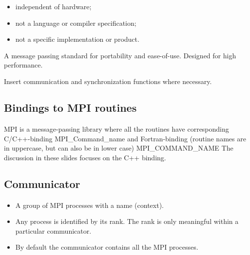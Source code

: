 \documentclass[%
oneside,                 %
final,                   %
10pt]{article}
\begin{document}
\begin{itemize}
\item independent of hardware;

\item not a language or compiler specification;

\item not a specific implementation or product.
\end{itemize}

\noindent
A message passing standard for portability and ease-of-use. 
Designed for high performance.

Insert communication and synchronization functions where necessary.





\subsection{Bindings to MPI routines}

\paragraph{}


MPI is a message-passing library where all the routines
have corresponding C/C++-binding
\bcppcod
   MPI_Command_name
\ecppcod
and Fortran-binding (routine names are in uppercase, but can also be in lower case)
\bforcod
   MPI_COMMAND_NAME
\eforcod
The discussion in these slides focuses on the C++ binding.




\subsection{Communicator}

\paragraph{}
\begin{itemize}
\item A group of MPI processes with a name (context).

\item Any process is identified by its rank. The rank is only meaningful within a particular communicator.

\item By default the communicator contains all the MPI processes.
\end{itemize}
\end{document}
